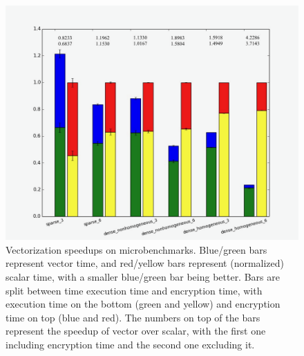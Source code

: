 \begin{figure}
    \includegraphics[width=0.9\columnwidth]{figures/graphs/TreeGraphwithNumbers.png}
    \caption{Vectorization speedups on microbenchmarks. Blue/green bars represent vector time, and red/yellow bars represent (normalized) scalar time, with a smaller blue/green bar being better. Bars are split between time execution time and encryption time, with execution time on the bottom (green and yellow) and encryption time on top (blue and red). The numbers on top of the bars represent the speedup of vector over scalar, with the first one including encryption time and the second one excluding it.}\label{fig:fuzzed-trees}
\end{figure}